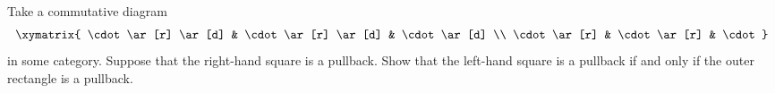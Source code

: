 \begin{exercise}
  Take a commutative diagram
  \[ \xymatrix{
    \cdot \ar[r] \ar[d] & \cdot \ar[r] \ar[d] & \cdot \ar[d] \\
    \cdot \ar[r] & \cdot \ar[r] & \cdot
  } \]
  in some category.  Suppose that the right-hand square is a pullback.  Show
  that the left-hand square is a pullback if and only if the outer rectangle is
  a pullback.
\end{exercise}




